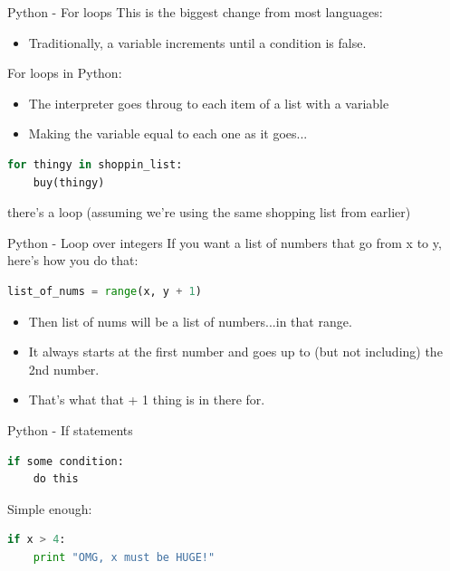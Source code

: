 \documentclass[fleqn,11pt,aspectratio=43]{beamer}
\begin{document}
\begin{frame}[fragile]{Python - For loops}
This is the biggest change from most languages:
\begin{itemize}
  \item Traditionally, a variable increments until a condition is false. 
\end{itemize}
For loops in Python:
\begin{itemize}
  \item The interpreter goes throug to each item of a list with a variable
  \item Making the variable equal to each one as it goes...
\end{itemize}
\begin{lstlisting}[language=python]
for thingy in shoppin_list:
    buy(thingy)
\end{lstlisting}

there's a loop (assuming we're using the same shopping list from earlier)
\end{frame}

\begin{frame}[fragile]{Python - Loop over integers}
If you want a list of numbers that go from x to y, here's how you do that:
\begin{lstlisting}[language=python]
list_of_nums = range(x, y + 1)
\end{lstlisting}

\begin{itemize}
  \item Then list of nums will be a list of numbers...in that range. 
  \item It always starts at the first number and goes up to (but not including) the 2nd number. 
  \item That's what that + 1 thing is in there for.
\end{itemize}
\end{frame}

\begin{frame}[fragile]{Python - If statements}
\begin{lstlisting}[language=python]
if some condition:
    do this
\end{lstlisting}

Simple enough:

\begin{lstlisting}[language=python]
if x > 4:
    print "OMG, x must be HUGE!"
\end{lstlisting}
\end{frame}
\end{document}
